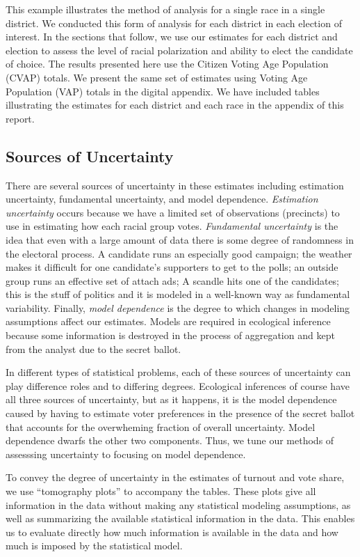 \documentclass[12pt]{scrartcl}
\begin{document}
This example illustrates the method of analysis for a single race in a
single district. We conducted this form of analysis for each district
in each election of interest. In the sections that follow, we use our
estimates for each district and election to assess the level of racial
polarization and ability to elect the candidate of choice.  The
results presented here use the Citizen Voting Age Population (CVAP)
totals. We present the same set of estimates using Voting Age
Population (VAP) totals in the digital appendix.  We have included
tables illustrating the estimates for each district and each race in
the appendix of this report.

\subsection{Sources of Uncertainty}

There are several sources of uncertainty in these estimates including
estimation uncertainty, fundamental uncertainty, and model dependence.
\emph{Estimation uncertainty} occurs because we have a limited set of
observations (precincts) to use in estimating how each racial group
votes.  \emph{Fundamental uncertainty} is the idea that even with a
large amount of data there is some degree of randomness in the
electoral process. A candidate runs an especially good campaign; the
weather makes it difficult for one candidate's supporters to get to
the polls; an outside group runs an effective set of attach ads; A
scandle hits one of the candidates; this is the stuff of politics and
it is modeled in a well-known way as fundamental variability.
Finally, \emph{model dependence} is the degree to which changes in
modeling assumptions affect our estimates.  Models are required in
ecological inference because some information is destroyed in the
process of aggregation and kept from the analyst due to the secret
ballot.

In different types of statistical problems, each of these sources of
uncertainty can play difference roles and to differing degrees.
Ecological inferences of course have all three sources of uncertainty,
but as it happens, it is the model dependence caused by having to
estimate voter preferences in the presence of the secret ballot that
accounts for the overwheming fraction of overall uncertainty.  Model
dependence dwarfs the other two components. Thus, we tune our methods
of assesssing uncertainty to focusing on model dependence.  

To convey the degree of uncertainty in the estimates of turnout and
vote share, we use ``tomography plots'' to accompany the tables.
These plots give all information in the data without making any
statistical modeling assumptions, as well as summarizing the available
statistical information in the data. This enables us to evaluate
directly how much information is available in the data and how much
is imposed by the statistical model.
\end{document}
